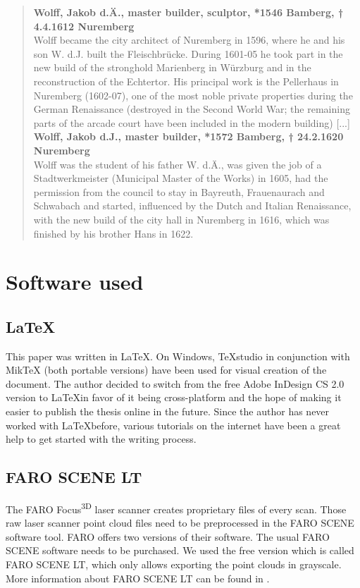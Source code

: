 \blockquote{
	
	\textbf{Wolff, Jakob d.Ä., master builder, sculptor, *1546 Bamberg, † 4.4.1612 Nuremberg} \\
	Wolff became the city architect of Nuremberg in 1596, where he and his son W. d.J. built the Fleischbrücke. During 1601-05 he took part in the new build of the stronghold Marienberg in Würzburg and in the reconstruction of the Echtertor. His principal work is the Pellerhaus in Nuremberg (1602-07), one of the most noble private properties during the German Renaissance (destroyed in the Second World War; the remaining parts of the arcade court have been included in the modern building) [...] \\
	
	\textbf{Wolff, Jakob d.J., master builder, *1572 Bamberg, † 24.2.1620 Nuremberg} \\
	Wolff was the student of his father W. d.Ä., was given the job of a Stadtwerkmeister (Municipal Master of the Works) in 1605, had the permission from the council to stay in Bayreuth, Frauenaurach and Schwabach and started, influenced by the Dutch and Italian Renaissance, with the new build of the city hall in Nuremberg in 1616, which was finished by his brother Hans in 1622. \\
	
}





\section{Software used}

\subsection{\LaTeX}
This paper was written in \LaTeX. On Windows, TeXstudio in conjunction with MikTeX (both portable versions) have been used for visual creation of the document. The author decided to switch from the free Adobe InDesign CS 2.0 version to \LaTeX in favor of it being cross-platform and the hope of making it easier to publish the thesis online in the future. Since the author has never worked with \LaTeX before, various tutorials \parencite{ytLaTeX,webLaTeX-Tutorial} on the internet have been a great help to get started with the writing process.

\subsection{FARO SCENE LT}
The FARO Focus\textsuperscript{3D} laser scanner creates proprietary files of every scan. Those raw laser scanner point cloud files need to be preprocessed in the FARO SCENE software tool. FARO offers two versions of their software. The usual FARO SCENE software needs to be purchased. We used the free version which is called FARO SCENE LT, which only allows exporting the point clouds in grayscale. More information about FARO SCENE LT can be found in \parencite{appendix_faro_scene_lt}.

